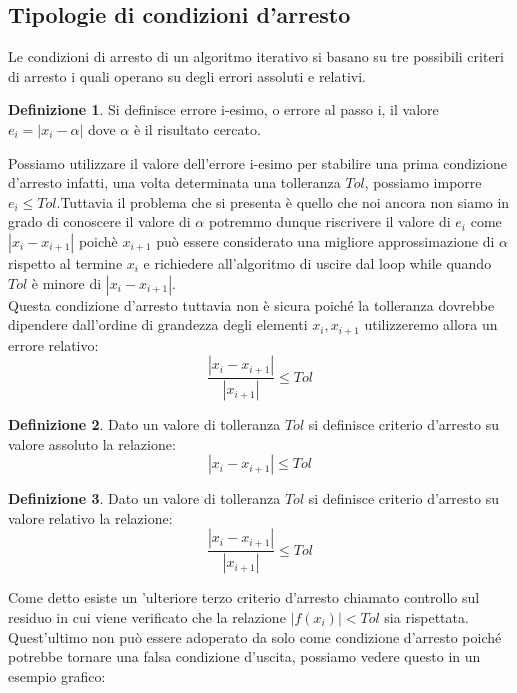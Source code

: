 \documentclass[12pt, a4paper]{book}
\theoremstyle{definition}
\newtheorem{defn}{Definizione}[section]
\begin{document}
\begin{flushleft}
\subsection{Tipologie di condizioni d'arresto}
Le condizioni di arresto di un algoritmo iterativo si basano su tre possibili criteri di arresto i quali operano su degli errori assoluti e relativi.
\begin{defn}
Si definisce errore i-esimo, o errore al passo i, il valore $e_{i} = |x_{i} - \alpha|$ dove $\alpha$ è il risultato cercato. 
\end{defn}
Possiamo utilizzare il valore dell'errore i-esimo per stabilire una prima condizione d'arresto infatti, una volta determinata una tolleranza $Tol$, possiamo imporre $e_{i} \leq Tol$.Tuttavia il problema che si presenta è quello che noi ancora non siamo in grado di conoscere il valore di $\alpha$ potremmo dunque riscrivere  il valore di $e_{i}$ come $|x_{i} - x_{i+1}|$ poichè $x_{i+1}$ può essere considerato una migliore approssimazione di $\alpha$ rispetto al termine $x_{i}$ e richiedere all'algoritmo di uscire dal loop while quando $Tol$ è minore di $|x_{i} - x_{i+1}|$.\\
\vspace{1em}
Questa condizione d'arresto tuttavia non è sicura poiché la tolleranza dovrebbe dipendere dall'ordine di grandezza degli elementi $x_{i}, x_{i+1}$ utilizzeremo allora un errore relativo: 
\[ 
	\dfrac{|x_{i} - x_{i+1}|}{|x_{i+1}|} \leq Tol
\]

\begin{defn}
Dato un valore di tolleranza $Tol$ si definisce criterio d'arresto su valore assoluto la relazione: 
\[ 
	|x_{i} - x_{i+1}| \leq Tol
\]
\end{defn}


\begin{defn}
Dato un valore di tolleranza $Tol$ si definisce criterio d'arresto su valore relativo la relazione: 
\[ 
	\dfrac{|x_{i} - x_{i+1}|}{|x_{i+1}|} \leq Tol
\]
\end{defn}

Come detto esiste un 'ulteriore terzo criterio d'arresto chiamato controllo sul residuo in cui viene verificato che la relazione $|f(x_{i})| < Tol$ sia rispettata.  
\pagebreak
Quest'ultimo non può essere adoperato da solo come condizione d'arresto poiché potrebbe tornare una falsa condizione d'uscita, possiamo vedere  questo in un esempio grafico: 

\begin{figure}[ht!]
\centering
{}
\end{figure}
\end{flushleft}
\end{document}
